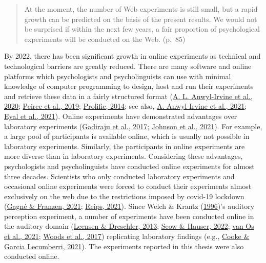 \documentclass[a4paper, nobind]{templates/ociamthesis}
\begin{document}
\begin{quote}
At the moment, the number of Web experiments is still small, but a rapid growth can be predicted on the basis of the present results.
We would not be surprised if within the next few years, a fair proportion of psychological experiments will be conducted on the Web. (p.~85)
\end{quote}

By 2022, there has been significant growth in online experiments as technical and technological barriers are greatly reduced.
There are many software and online platforms which psychologists and psycholinguists can use with minimal knowledge of computer programming
to design, host and run their experiments and retrieve these data in a fairly structured format (\protect\hyperlink{ref-Anwylirvine2020}{A. L. Anwyl-Irvine et al., 2020}; \protect\hyperlink{ref-Peirce2019}{Peirce et al., 2019}; \protect\hyperlink{ref-Prolific}{Prolific, 2014}; see also, \protect\hyperlink{ref-Anwylirvine2021}{A. Anwyl-Irvine et al., 2021}; \protect\hyperlink{ref-Eyal2021}{Eyal et al., 2021}).
Online experiments have demonstrated advantages over laboratory experiments (\protect\hyperlink{ref-Gadiraju2017}{Gadiraju et al., 2017}; \protect\hyperlink{ref-Johnson2021}{Johnson et al., 2021}).
For example, a large pool of participants is available online, which is usually not possible in laboratory experiments.
Similarly, the participants in online experiments are more diverse than in laboratory experiments.
Considering these advantages, psychologists and psycholinguists have conducted online experiments for almost three decades.
Scientists who only conducted laboratory experiments and occasional online experiments were forced to conduct their experiments almost exclusively on the web due to the restrictions imposed by covid-19 lockdown (\protect\hyperlink{ref-Gagne2021}{Gagné \& Franzen, 2021}; \protect\hyperlink{ref-Reips2021}{Reips, 2021}).
Since Welch \& Krantz (\protect\hyperlink{ref-Welch1996}{1996})'s auditory perception experiment, a number of experiments have been conducted online in the auditory domain (\protect\hyperlink{ref-Leensen2013}{Leensen \& Dreschler, 2013}; \protect\hyperlink{ref-Seow2022}{Seow \& Hauser, 2022}; \protect\hyperlink{ref-vanOs2021}{van Os et al., 2021}; \protect\hyperlink{ref-Woods2017}{Woods et al., 2017}) replicating laboratory findings (e.g., \protect\hyperlink{ref-Cooke2021}{Cooke \& Garcia Lecumberri, 2021}).
The experiments reported in this thesis were also conducted online.
\end{document}
